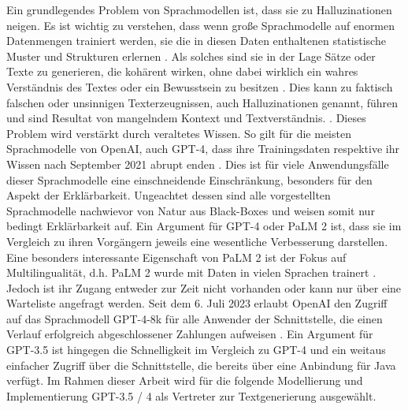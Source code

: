 Ein grundlegendes Problem von Sprachmodellen ist, dass sie zu Halluzinationen neigen.
Es ist wichtig zu verstehen, dass wenn große Sprachmodelle auf enormen Datenmengen trainiert werden, sie die in diesen Daten enthaltenen statistische Muster und Strukturen erlernen \cite{basel-ml-arch}.
Als solches sind sie in der Lage Sätze oder Texte zu generieren, die kohärent wirken, ohne dabei wirklich ein wahres Verständnis des Textes oder ein Bewusstsein zu besitzen \cite{basel-ml-arch}.
Dies kann zu faktisch falschen oder unsinnigen Texterzeugnissen, auch Halluzinationen genannt, führen und sind Resultat von mangelndem Kontext und Textverständnis. \cite{sabre-pc-ai-hallucinations}.
Dieses Problem wird verstärkt durch veraltetes Wissen.
So gilt für die meisten Sprachmodelle von OpenAI, auch GPT-4, dass ihre Trainingsdaten respektive ihr Wissen nach September 2021 abrupt enden \cite{openai-gpt-sep-2021}.
Dies ist für viele Anwendungsfälle dieser Sprachmodelle eine einschneidende Einschränkung, besonders für den Aspekt der Erklärbarkeit.
Ungeachtet dessen sind alle vorgestellten Sprachmodelle nachwievor von Natur aus Black-Boxes und weisen somit nur bedingt Erklärbarkeit auf.
Ein Argument für GPT-4 oder PaLM 2 ist, dass sie im Vergleich zu ihren Vorgängern jeweils eine wesentliche Verbesserung darstellen.
Eine besonders interessante Eigenschaft von PaLM 2 ist der Fokus auf Multilingualität, d.h. PaLM 2 wurde mit Daten in vielen Sprachen trainert \cite{google-palm2-techreport}.
Jedoch ist ihr Zugang entweder zur Zeit nicht vorhanden oder kann nur über eine Warteliste angefragt werden.
Seit dem 6. Juli 2023 erlaubt OpenAI den Zugriff auf das Sprachmodell GPT-4-8k für alle Anwender der Schnittstelle, die einen Verlauf erfolgreich abgeschlossener Zahlungen aufweisen \cite{openai-gpt4-access}.
Ein Argument für GPT-3.5 ist hingegen die Schnelligkeit im Vergleich zu GPT-4 und ein weitaus einfacher Zugriff über die Schnittstelle, die bereits über eine Anbindung für Java verfügt.
Im Rahmen dieser Arbeit wird für die folgende Modellierung und Implementierung GPT-3.5 / 4 als Vertreter zur Textgenerierung ausgewählt.

